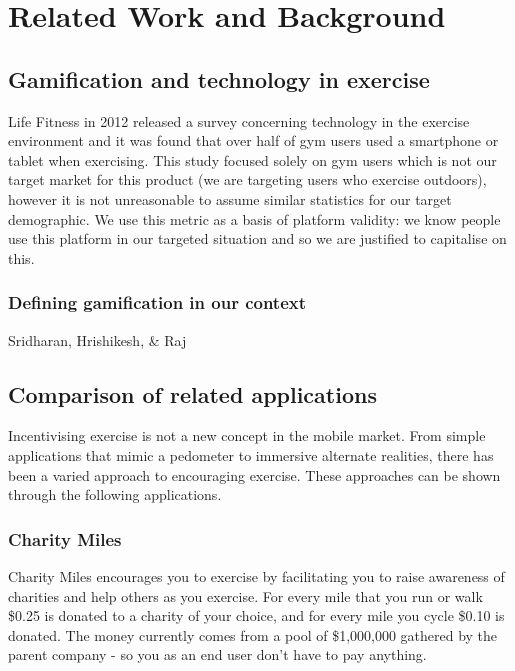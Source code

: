 \chapter{Related Work and Background}\label{ch_background}

\section{Gamification and technology in exercise}

Life Fitness in 2012 released a survey concerning technology in the
exercise environment\cite{lifefitness} and it was found that over half of
gym users used a smartphone or tablet when exercising. This study
focused solely on gym users which is not our target market for this
product (we are targeting users who exercise outdoors), however it is
not unreasonable to assume similar statistics for our target
demographic. We use this metric as a basis of platform validity: we
know people use this platform in our targeted situation and so we are
justified to capitalise on this.

\subsection{Defining gamification in our context}
Sridharan, Hrishikesh, \& Raj\cite{academic_gamification}





\section{Comparison of related applications}\label{sec_comparison}
Incentivising exercise is not a new concept in the mobile market. From
simple applications that mimic a pedometer to immersive alternate
realities, there has been a varied approach to encouraging
exercise. These approaches can be shown through the following
applications.

\subsection{Charity Miles}
Charity Miles encourages you to exercise by facilitating you to raise
awareness of charities and help
others as you exercise. For every mile that you run or walk \$0.25 is
donated to a charity of your choice, and for every mile you cycle \$0.10
is donated. The money currently comes from a pool of \$1,000,000
gathered by the parent company - so you as an end user don't have to pay
anything. 

